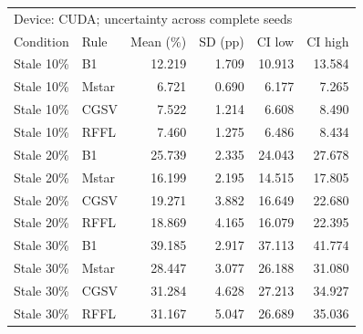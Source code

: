 \begin{tabular}{llrrrr}
\toprule
\multicolumn{6}{l}{Device: CUDA; uncertainty across complete seeds} \\
Condition & Rule & Mean (\%) & SD (pp) & CI low & CI high \\
\midrule
Stale 10\% & B1 & 12.219 & 1.709 & 10.913 & 13.584 \\
Stale 10\% & Mstar & 6.721 & 0.690 & 6.177 & 7.265 \\
Stale 10\% & CGSV & 7.522 & 1.214 & 6.608 & 8.490 \\
Stale 10\% & RFFL & 7.460 & 1.275 & 6.486 & 8.434 \\
Stale 20\% & B1 & 25.739 & 2.335 & 24.043 & 27.678 \\
Stale 20\% & Mstar & 16.199 & 2.195 & 14.515 & 17.805 \\
Stale 20\% & CGSV & 19.271 & 3.882 & 16.649 & 22.680 \\
Stale 20\% & RFFL & 18.869 & 4.165 & 16.079 & 22.395 \\
Stale 30\% & B1 & 39.185 & 2.917 & 37.113 & 41.774 \\
Stale 30\% & Mstar & 28.447 & 3.077 & 26.188 & 31.080 \\
Stale 30\% & CGSV & 31.284 & 4.628 & 27.213 & 34.927 \\
Stale 30\% & RFFL & 31.167 & 5.047 & 26.689 & 35.036 \\
\bottomrule
\end{tabular}
